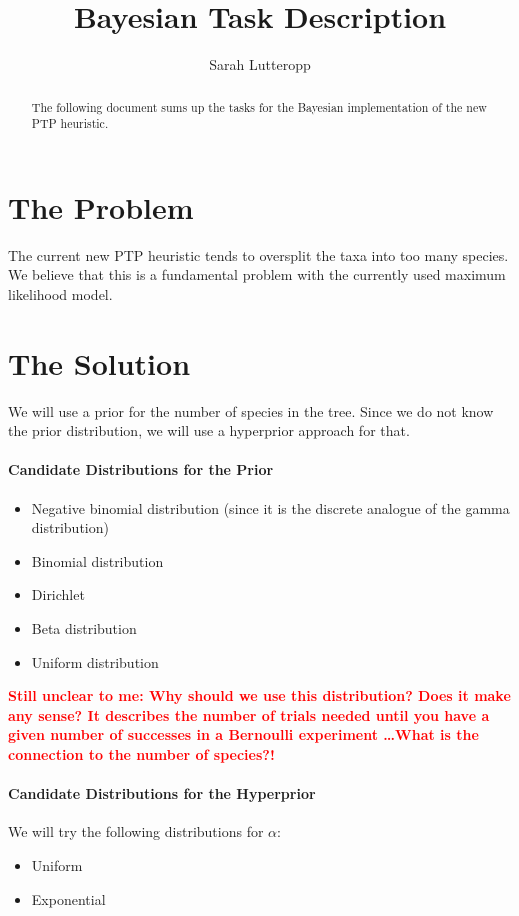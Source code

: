 \documentclass[10pt,a4paper]{article}
\title{Bayesian Task Description}
\author{Sarah Lutteropp}
\begin{document}
\maketitle

\begin{abstract}
The following document sums up the tasks for the Bayesian implementation of the new PTP heuristic.
\end{abstract}

\section{The Problem}
The current new PTP heuristic tends to oversplit the taxa into too many species. We believe that this is a fundamental problem with the currently used maximum likelihood model.

\section{The Solution}
We will use a prior for the number of species in the tree. Since we do not know the prior distribution, we will use a hyperprior approach for that.

\paragraph{Candidate Distributions for the Prior}
\begin{itemize}
\item Negative binomial distribution (since it is the discrete analogue of the gamma distribution)
\item Binomial distribution
\item Dirichlet

\item Beta distribution
\item Uniform distribution
\end{itemize}

\textcolor{red}{\textbf{Still unclear to me: Why should we use this distribution? Does it make any sense? It describes the number of trials needed until you have a given number of successes in a Bernoulli experiment \ldots What is the connection to the number of species?!}}

\paragraph{Candidate Distributions for the Hyperprior}
We will try the following distributions for $\alpha$:
\begin{itemize}
	\item Uniform
	\item Exponential
\end{itemize}
\end{document}
